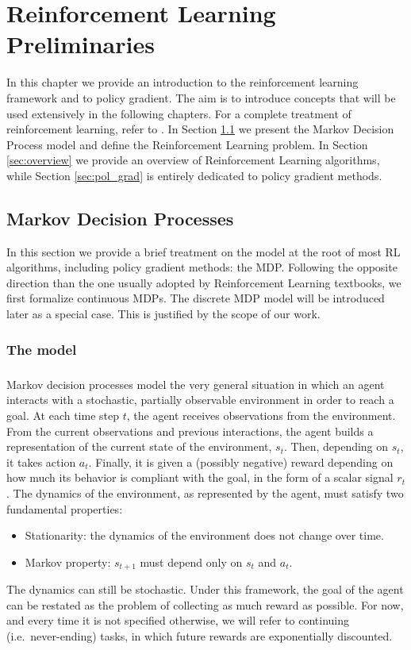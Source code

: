 \chapter{Reinforcement Learning Preliminaries}
In this chapter we provide an introduction to the reinforcement learning framework and to policy gradient.
The aim is to introduce concepts that will be used extensively in the following chapters. For a complete treatment of reinforcement learning, refer to \cite{Sutton:1998:IRL:551283}.
In Section \ref{sec:MDP} we present the Markov Decision Process model and define the Reinforcement Learning problem. In Section \ref{sec:overview} we provide an overview of Reinforcement Learning algorithms, while Section \ref{sec:pol_grad} is entirely dedicated to policy gradient methods.

\section{Markov Decision Processes}\label{sec:MDP}
In this section we provide a brief treatment on the model at the root of most \ac{RL} algorithms, including policy gradient methods: the \ac{MDP}.  
Following the opposite direction than the one usually adopted by Reinforcement Learning textbooks, we first formalize continuous \ac{MDP}s. The discrete \ac{MDP} model will be introduced later as a special case. This is justified by the scope of our work.

\subsection{The model}
\paragraph{} %
Markov decision processes model the very general situation in which an agent interacts with a stochastic, partially observable environment in order to reach a goal. At each time step $t$, the agent receives observations from the environment. From the current observations and previous interactions, the agent builds a representation of the current state of the environment, $s_t$. Then, depending on $s_t$, it takes action $a_t$. Finally, it is given a (possibly negative) reward depending on how much its behavior is compliant with the goal, in the form of a scalar signal $r_t$. The dynamics of the environment, as represented by the agent, must satisfy two fundamental properties:
\begin{itemize}
\item Stationarity: the dynamics of the environment does not change over time.
\item Markov property: $s_{t+1}$ must depend only on $s_t$ and $a_t$.
\end{itemize}
The dynamics can still be stochastic.
Under this framework, the goal of the agent can be restated as the problem of collecting as much reward as possible. For now, and every time it is not specified otherwise, we will refer to continuing (i.e.\ never-ending) tasks, in which future rewards are exponentially discounted.


